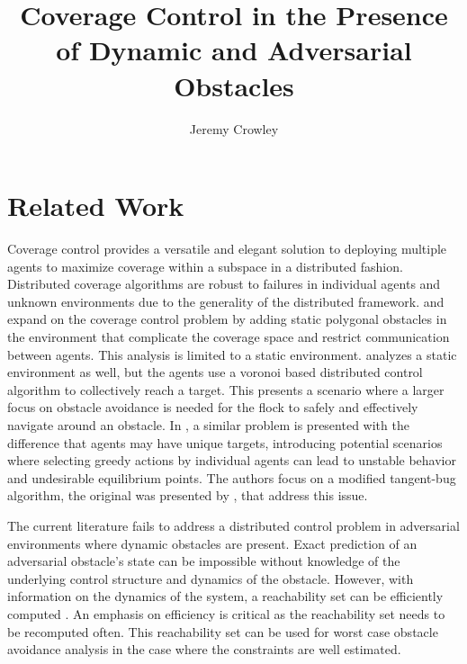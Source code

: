 \documentclass{article}
\begin{document}
\title{Coverage Control in the Presence of Dynamic and Adversarial Obstacles}
\author{Jeremy Crowley}

\maketitle

\section{Related Work}

Coverage control provides a versatile and elegant solution to deploying multiple agents to maximize coverage within a subspace in a distributed fashion. Distributed coverage algorithms are robust to failures in individual agents and unknown environments due to the generality of the distributed framework. \cite{rout} and \cite{zhong} expand on the coverage control problem by adding static polygonal obstacles in the environment that complicate the coverage space and restrict communication between agents. This analysis is limited to a static environment. \cite{lindhe} analyzes a static environment as well, but the agents use a voronoi based distributed control algorithm to collectively reach a target. This presents a scenario where a larger focus on obstacle avoidance is needed for the flock to safely and effectively navigate around an obstacle. In \cite{franco}, a similar problem is presented with the difference that agents may have unique targets, introducing potential scenarios where selecting greedy actions by individual agents can lead to unstable behavior and undesirable equilibrium points. The authors focus on a modified tangent-bug algorithm, the original was presented by \cite{kamon}, that address this issue.

The current literature fails to address a distributed control problem in adversarial environments where dynamic obstacles are present. Exact prediction of an adversarial obstacle's state can be impossible without knowledge of the underlying control structure and dynamics of the obstacle. However, with information on the dynamics of the system, a reachability set can be efficiently computed \cite{girard}. An emphasis on efficiency is critical as the reachability set needs to be recomputed often. This reachability set can be used for worst case obstacle avoidance analysis in the case where the constraints are well estimated. 
\end{document}
